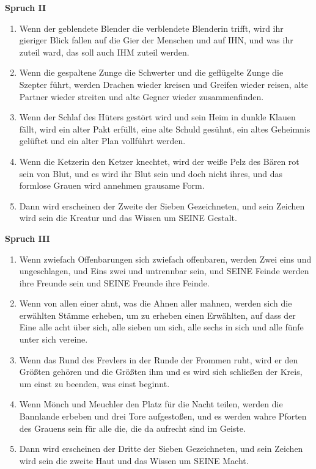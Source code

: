 \textbf{Spruch II}

\begin{enumerate}
    \item Wenn der geblendete Blender die verblendete Blenderin trifft, wird ihr gieriger Blick fallen auf die Gier der Menschen und auf IHN, und was ihr zuteil ward, das soll auch IHM zuteil werden.
    \item Wenn die gespaltene Zunge die Schwerter und die geflügelte Zunge die Szepter führt, werden Drachen wieder kreisen und Greifen wieder reisen, alte Partner wieder streiten und alte Gegner wieder zusammenfinden.
    \item Wenn der Schlaf des Hüters gestört wird und sein Heim in dunkle Klauen fällt, wird ein alter Pakt erfüllt, eine alte Schuld gesühnt, ein altes Geheimnis gelüftet und ein alter Plan vollführt werden.
    \item Wenn die Ketzerin den Ketzer knechtet, wird der weiße Pelz des Bären rot sein von Blut, und es wird ihr Blut sein und doch nicht ihres, und das formlose Grauen wird annehmen grausame Form.
    \item Dann wird erscheinen der Zweite der Sieben Gezeichneten, und sein Zeichen wird sein die Kreatur und das Wissen um SEINE Gestalt.
\end{enumerate}

\textbf{Spruch III}

\begin{enumerate}
    \item Wenn zwiefach Offenbarungen sich zwiefach offenbaren, werden Zwei eins und ungeschlagen, und Eins zwei und untrennbar sein, und SEINE Feinde werden ihre Freunde sein und SEINE Freunde ihre Feinde.
    \item Wenn von allen einer ahnt, was die Ahnen aller mahnen, werden sich die erwählten Stämme erheben, um zu erheben einen Erwählten, auf dass der Eine alle acht über sich, alle sieben um sich, alle sechs in sich und alle fünfe unter sich vereine.
    \item Wenn das Rund des Frevlers in der Runde der Frommen ruht, wird er den Größten gehören und die Größten ihm und es wird sich schließen der Kreis, um einst zu beenden, was einst beginnt.
    \item Wenn Mönch und Meuchler den Platz für die Nacht teilen, werden die Bannlande erbeben und drei Tore aufgestoßen, und es werden wahre Pforten des Grauens sein für alle die, die da aufrecht sind im Geiste.
    \item Dann wird erscheinen der Dritte der Sieben Gezeichneten, und sein Zeichen wird sein die zweite Haut und das Wissen um SEINE Macht.
\end{enumerate}

